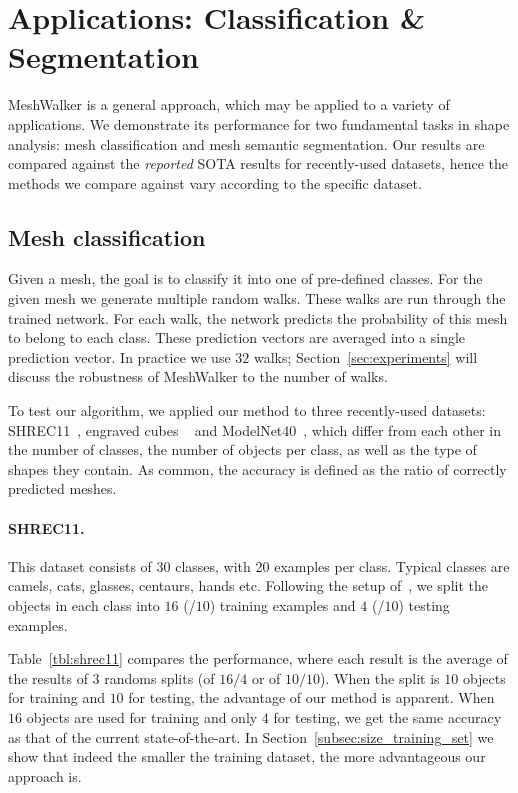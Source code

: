 \documentclass[acmtog]{acmart}
\begin{document}
\section{Applications: Classification \& Segmentation}
\label{sec:applications}
MeshWalker is a general approach, which may be applied to a variety of applications.
We demonstrate its performance for two fundamental tasks in shape analysis: mesh classification and mesh semantic segmentation. 
Our results are compared against the {\em reported} SOTA results for recently-used datasets, hence the methods we compare against vary according to the specific dataset.


\subsection{Mesh classification}
\label{subsec:classification}
Given a mesh, the goal is to classify it into one of pre-defined classes.
For the given mesh we generate multiple random walks.
These walks are run through the trained network. 
For each walk, the network predicts the probability of this mesh to belong to each class.
These prediction vectors are averaged into a single prediction vector.
In practice we use $32$ walks; Section~\ref{sec:experiments} will discuss the robustness of MeshWalker to the number of walks. 

To test our algorithm, we applied our method to three recently-used datasets: SHREC11~\cite{lian2011shape}, engraved cubes ~\cite{hanocka2019meshcnn} and ModelNet40~\cite{wu20153d}, which differ from each other in the number of classes, the number of objects per class, as well as the type of shapes they contain.
As common, the accuracy is defined as the ratio of correctly predicted meshes.

\paragraph{SHREC11.}
This dataset consists of $30$ classes, with 20 examples per class.
Typical classes are camels, cats, glasses, centaurs, hands etc.
Following the setup of~\cite{ezuz2017gwcnn}, we split the objects in each class into $16$ (/$10$)  training examples and $4$  (/$10$) testing examples.

Table~\ref{tbl:shrec11} compares the performance, where each result is the average of the results of $3$ randoms splits (of $16/4$ or of $10/10$). 
When the split is $10$ objects for training and $10$ for testing, the advantage of our method is apparent. 
When $16$ objects are used for training and only $4$ for testing, we get the same accuracy as that of the current state-of-the-art. 
In Section~\ref{subsec:size_training_set} we show that indeed the smaller the training dataset, the more advantageous our approach is.
\end{document}
